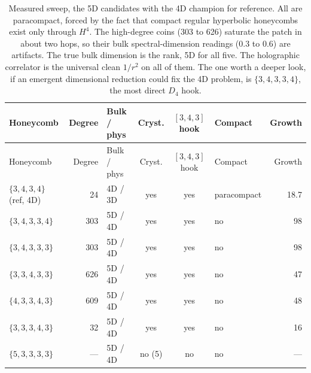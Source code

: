 {\small
\begin{longtable}{l r l c c p{0.9in} r}
\toprule
Honeycomb & Degree & Bulk / phys & Cryst. & $[3,4,3]$ hook & Compact & Growth \\
\midrule
\endfirsthead
\toprule
Honeycomb & Degree & Bulk / phys & Cryst. & $[3,4,3]$ hook & Compact & Growth \\
\midrule
\endhead
\bottomrule
\endfoot
\bottomrule
\caption{Measured sweep, the 5D candidates with the 4D champion for reference. All are paracompact, forced by the
fact that compact regular hyperbolic honeycombs exist only through $H^4$. The high-degree coins (303 to 626)
saturate the patch in about two hops, so their bulk spectral-dimension readings (0.3 to 0.6) are artifacts. The
true bulk dimension is the rank, 5D for all five. The holographic correlator is the universal clean $1/r^2$ on
all of them. The one worth a deeper look, if an emergent dimensional reduction could fix the 4D problem, is
$\{3,4,3,3,4\}$, the most direct $D_4$ hook.}
\label{tab:sweep-5d}
\endlastfoot
$\{3,4,3,4\}$ (ref, 4D) & 24 & 4D / 3D & yes & yes & paracompact & 18.7 \\
$\{3,4,3,3,4\}$ & 303 & 5D / 4D & yes & yes & no & 98 \\
$\{3,4,3,3,3\}$ & 303 & 5D / 4D & yes & yes & no & 98 \\
$\{3,3,4,3,3\}$ & 626 & 5D / 4D & yes & yes & no & 47 \\
$\{4,3,3,4,3\}$ & 609 & 5D / 4D & yes & yes & no & 48 \\
$\{3,3,3,4,3\}$ & 32 & 5D / 4D & yes & yes & no & 16 \\
$\{5,3,3,3,3\}$ & --- & 5D / 4D & no (5) & no & no & --- \\
\end{longtable}}
